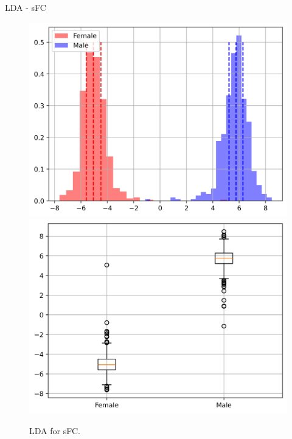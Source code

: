 \documentclass{beamer}
\begin{document}
\begin{frame}{LDA - sFC}
\begin{figure}[H]
{\begin{minipage}[b]{0.3\textwidth}
                \includegraphics[width=1\textwidth]{../Analysis/LDA/node=50_size=4800_step=4800_rho=0.1/hist_0.jpg}
                \includegraphics[width=1\textwidth]{../Analysis/LDA/node=50_size=4800_step=4800_rho=0.1/box_0.jpg}
            \end{minipage}
        }
        \caption{LDA for sFC.}
    \end{figure}

\end{frame}

\end{document}

